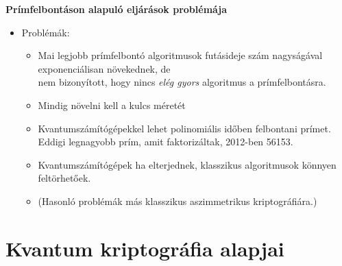 \documentclass{beamer}
\begin{document}
    \begin{frame}

        \center

        \textbf{Prímfelbontáson alapuló eljárások problémája}

        \begin{itemize}
            \item Problémák:
                \begin{itemize}
                    \item Mai legjobb prímfelbontó algoritmusok futásideje szám nagyságával exponenciálisan növekednek, de\\
                    nem bizonyított, hogy nincs \textit{elég gyors} algoritmus a prímfelbontásra.
                    \item Mindig növelni kell a kulcs méretét
                    \item Kvantumszámítógépekkel lehet polinomiális időben felbontani prímet.\\
                        Eddigi legnagyobb prím, amit faktorizáltak, 2012-ben 56153.
                    \item Kvantumszámítógépek ha elterjednek, klasszikus algoritmusok könnyen feltörhetőek.
                    \item (Hasonló problémák más klasszikus aszimmetrikus kriptográfiára.)
                \end{itemize}
        \end{itemize}

    \end{frame}

    \section{Kvantum kriptográfia alapjai}
\end{document}
